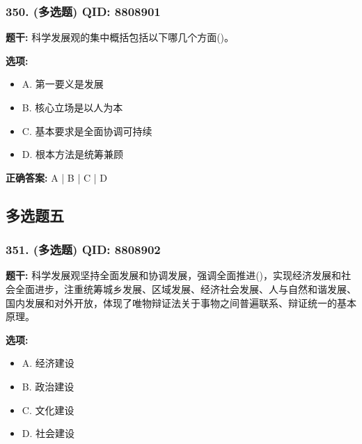 \documentclass[12pt,UTF8]{ctexart}
\begin{document}
\subsubsection*{350. (多选题) \small QID: 8808901}

\textbf{题干:}
科学发展观的集中概括包括以下哪几个方面()。

\textbf{选项:}
\begin{itemize}[leftmargin=*]

  \item A. 第一要义是发展

  \item B. 核心立场是以人为本

  \item C. 基本要求是全面协调可持续

  \item D. 根本方法是统筹兼顾

\end{itemize}

\textbf{正确答案:}
A | B | C | D

\vspace{0.3em}\hrulefill\vspace{0.7em}

\subsection*{多选题五}

\subsubsection*{351. (多选题) \small QID: 8808902}

\textbf{题干:}
科学发展观坚持全面发展和协调发展，强调全面推进()，实现经济发展和社会全面进步，注重统筹城乡发展、区域发展、经济社会发展、人与自然和谐发展、国内发展和对外开放，体现了唯物辩证法关于事物之间普遍联系、辩证统一的基本原理。

\textbf{选项:}
\begin{itemize}[leftmargin=*]

  \item A. 经济建设

  \item B. 政治建设

  \item C. 文化建设

  \item D. 社会建设

\end{itemize}
\end{document}
